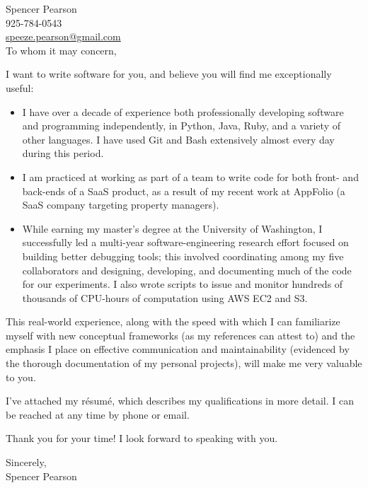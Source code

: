 \documentclass{article}
\begin{document}
Spencer Pearson \\
925-784-0543 \\
\href{mailto:speeze.pearson@gmail.com}{speeze.pearson@gmail.com}
\\

To whom it may concern,

I want to write software for you, and believe you will find me exceptionally useful:

\begin{itemize}
\item I have over a decade of experience both professionally developing software and programming independently, in Python, Java, Ruby, and a variety of other languages. I have used Git and Bash extensively almost every day during this period.
\item I am practiced at working as part of a team to write code for both front- and back-ends of a SaaS product, as a result of my recent work at AppFolio (a SaaS company targeting property managers).
\item While earning my master’s degree at the University of Washington, I successfully led a multi-year software-engineering research effort focused on building better debugging tools; this involved coordinating among my five collaborators and designing, developing, and documenting much of the code for our experiments. I also wrote scripts to issue and monitor hundreds of thousands of CPU-hours of computation using AWS EC2 and S3.
\end{itemize}

\noindent
This real-world experience, along with the speed with which I can familiarize myself with new conceptual frameworks  (as my references can attest to) and the emphasis I place on effective communication and maintainability (evidenced by the thorough documentation of my personal projects), will make me very valuable to you.

I've attached my r\'esum\'e, which describes my qualifications in more detail. I can be reached at any time by phone or email.

Thank you for your time! I look forward to speaking with you.

Sincerely, \\
Spencer Pearson
\end{document}
